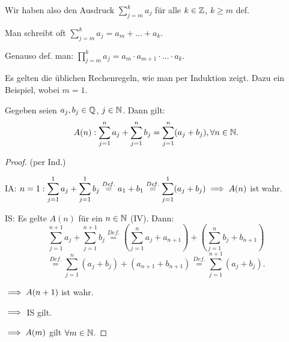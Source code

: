 \documentclass[12pt]{scrreprt}
\begin{document}
\begin{bsp}
Wir haben also den Ausdruck $\displaystyle \sum_{j=m}^k a_j$ für alle $k\in\mathbb{Z}$, $k \geq m$ def.

Man schreibt oft $\displaystyle \sum_{j=m}^k a_j = a_m + \ldots + a_k$.

Genauso def. man: $\displaystyle \prod_{j=m}^k a_j = a_m \cdot a_{m+1} \cdot \ldots \cdot a_k$.

Es gelten die üblichen Rechenregeln, wie man per Induktion zeigt. Dazu ein Beispiel, wobei $m = 1$.

Gegeben seien $a_j, b_j\in\mathbb{Q}$, $j\in\mathbb{N}$. Dann gilt:
\[A(n): \sum_{j=1}^n a_j + \sum_{j=1}^n b_j = \sum_{j=1}^n (a_j + b_j), \forall n\in\mathbb{N}.\]

\begin{proof} (per Ind.)

IA: $\displaystyle n = 1: \sum_{j=1}^1 a_j + \sum_{j=1}^1 b_j \stackrel{\mathit{Def.}}{=} a_1 + b_1 \stackrel{\mathit{Def.}}{=} \sum_{j=1}^1 (a_j + b_j) \implies A(n)$ ist wahr.

IS: Es gelte $A(n)$ für ein $n\in\mathbb{N}$ (IV). Dann:
\[\sum_{j=1}^{n+1} a_j + \sum_{j=1}^{n+1} b_j \stackrel{\mathit{Def.}}{=} \left(\sum_{j=1}^n a_j + a_{n+1}\right) + \left(\sum_{j=1}^n b_j + b_{n+1}\right)\]
\[\stackrel{\mathit{Def.}}{=} \sum_{j=1}^n (a_j + b_j) + (a_{n+1} + b_{n+1}) \stackrel{\mathit{Def.}}{=} \sum_{j=1}^{n+1} (a_j + b_j).\]

$\implies A(n+1)$ ist wahr.

$\implies$ IS gilt.

$\implies A(m)$ gilt $\forall m\in\mathbb{N}$.
\end{proof}
\end{bsp}
\end{document}
